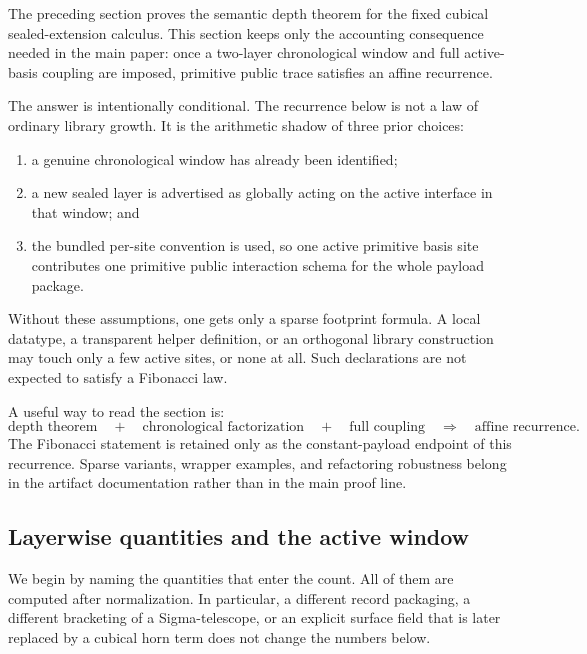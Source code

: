 \documentclass{lmcs}
\begin{document}
The preceding section proves the semantic depth theorem for the fixed cubical
sealed-extension calculus.  This section keeps only the accounting consequence needed in the
main paper: once a two-layer chronological window and full active-basis coupling are imposed,
primitive public trace satisfies an affine recurrence.

The answer is intentionally conditional.  The recurrence below is not a law of ordinary
library growth.  It is the arithmetic shadow of three prior choices:
\begin{enumerate}
\item a genuine chronological window has already been identified;
\item a new sealed layer is advertised as globally acting on the active interface in that
window; and
\item the bundled per-site convention is used, so one active primitive basis site contributes
one primitive public interaction schema for the whole payload package.
\end{enumerate}
Without these assumptions, one gets only a sparse footprint formula.  A local datatype, a
transparent helper definition, or an orthogonal library construction may touch only a few
active sites, or none at all.  Such declarations are not expected to satisfy a Fibonacci law.

A useful way to read the section is:
\[
  \text{depth theorem}
  \quad+\quad
  \text{chronological factorization}
  \quad+\quad
  \text{full coupling}
  \quad\Longrightarrow\quad
  \text{affine recurrence}.
\]
The Fibonacci statement is retained only as the constant-payload endpoint of this recurrence.
Sparse variants, wrapper examples, and refactoring robustness belong in the artifact
documentation rather than in the main proof line.

\subsection{Layerwise quantities and the active window}
\label{subsec:layerwise-quantities}

We begin by naming the quantities that enter the count.  All of them are computed after
normalization.  In particular, a different record packaging, a different bracketing of a
Sigma-telescope, or an explicit surface field that is later replaced by a cubical horn term
does not change the numbers below.
\end{document}
